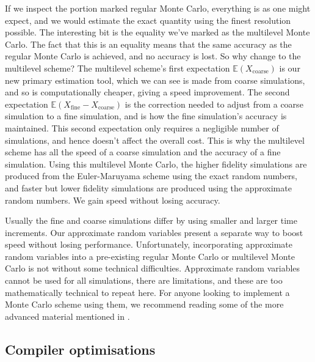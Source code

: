 \documentclass[11pt,a4paper,twoside,english]{extarticle}
\begin{document}
If we inspect the portion marked regular Monte Carlo, everything is as one might expect, and we would estimate the exact quantity using the finest resolution possible. The interesting bit is the equality we've marked as the multilevel Monte Carlo. The fact that this is an equality means that the same accuracy as the regular Monte Carlo is achieved, and no accuracy is lost. So why change to the multilevel scheme? The multilevel scheme's first expectation $ \mathbb{E}(X_{\mathrm{coarse}}) $ is our new primary estimation tool, which we can see is made from coarse simulations, and so is computationally  cheaper, giving a speed improvement. The second expectation $ \mathbb{E}(X_{\mathrm{fine}} - X_{\mathrm{coarse}}) $ is the correction needed to adjust from a coarse simulation to a fine simulation, and is how the fine simulation's accuracy is maintained. This second expectation only requires a negligible number of simulations, and hence doesn't affect the overall cost. This is why the multilevel scheme has all the speed of a coarse simulation and the accuracy of a fine simulation. Using this multilevel Monte Carlo, the higher fidelity simulations are produced from the Euler-Maruyama scheme using the exact random numbers, and faster but lower fidelity simulations are produced using the approximate random numbers. We gain speed without losing accuracy.

Usually the fine and coarse simulations differ by using smaller and larger time increments. Our approximate random variables present a separate way to boost speed without losing performance. Unfortunately, incorporating approximate random variables into a pre-existing regular Monte Carlo or multilevel Monte Carlo is not without some technical difficulties. Approximate random variables cannot be used for all simulations, there are limitations, and these are too mathematically technical to repeat here. For anyone looking to implement a  Monte Carlo scheme using them, we recommend reading some of the more advanced material mentioned in .



\subsection{Compiler optimisations}
\end{document}
